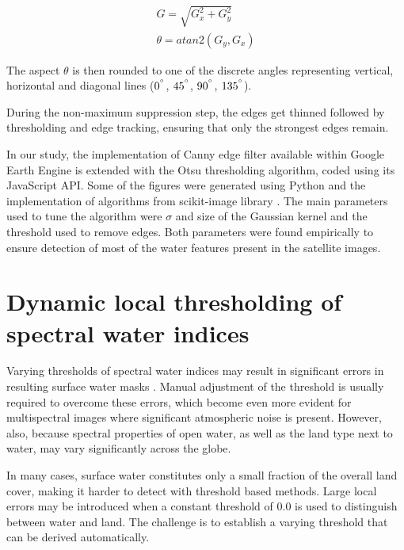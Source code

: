 \begin{gather}
G = \sqrt{G_x^2 + G_y^2} \\
\theta = atan2\left(G_y, G_x\right)
\end{gather}

The aspect $\theta$ is then rounded to one of the discrete angles representing vertical, horizontal and diagonal lines ($0^{\degree}$, $45^{\degree}$, $90^{\degree}$, $135^{\degree}$).

During the non-maximum suppression step, the edges get thinned followed by thresholding and edge tracking, ensuring that only the strongest edges remain.

In our study, the implementation of Canny edge filter available within Google Earth Engine is extended with the Otsu thresholding algorithm, coded using its JavaScript API. Some of the figures were generated using Python and the implementation of algorithms from scikit-image library \citet{webScikitImage}. The main parameters used to tune the algorithm were $\sigma$ and size of the Gaussian kernel and the threshold used to remove edges. Both parameters were found empirically to ensure detection of most of the water features present in the satellite images.

\section{Dynamic local thresholding of spectral water indices}


Varying thresholds of spectral water indices may result in significant errors in resulting surface water masks \citet{Yang2014}. Manual adjustment of the threshold is usually required to overcome these errors, which become even more evident for multispectral images where significant atmospheric noise is present. However, also, because spectral properties of open water, as well as the land type next to water, may vary significantly across the globe. 

In many cases, surface water constitutes only a small fraction of the overall land cover, making it harder to detect with threshold based methods. Large local errors may be introduced when a constant threshold of 0.0 is used to distinguish between water and land. The challenge is to establish a varying threshold that can be derived automatically. 

